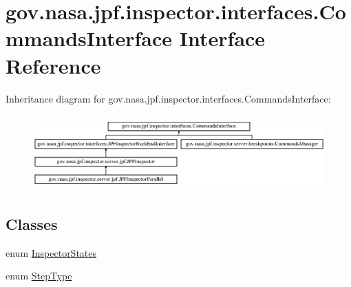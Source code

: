 \hypertarget{interfacegov_1_1nasa_1_1jpf_1_1inspector_1_1interfaces_1_1_commands_interface}{}\section{gov.\+nasa.\+jpf.\+inspector.\+interfaces.\+Commands\+Interface Interface Reference}
\label{interfacegov_1_1nasa_1_1jpf_1_1inspector_1_1interfaces_1_1_commands_interface}
Inheritance diagram for gov.\+nasa.\+jpf.\+inspector.\+interfaces.\+Commands\+Interface\+:\begin{figure}[H]
\begin{center}
\leavevmode
\includegraphics[height=2.909091cm]{interfacegov_1_1nasa_1_1jpf_1_1inspector_1_1interfaces_1_1_commands_interface}
\end{center}
\end{figure}
\subsection*{Classes}
\begin{DoxyCompactItemize}
\item 
enum \hyperlink{enumgov_1_1nasa_1_1jpf_1_1inspector_1_1interfaces_1_1_commands_interface_1_1_inspector_states}{Inspector\+States}
\item 
enum \hyperlink{enumgov_1_1nasa_1_1jpf_1_1inspector_1_1interfaces_1_1_commands_interface_1_1_step_type}{Step\+Type}
\end{DoxyCompactItemize}

